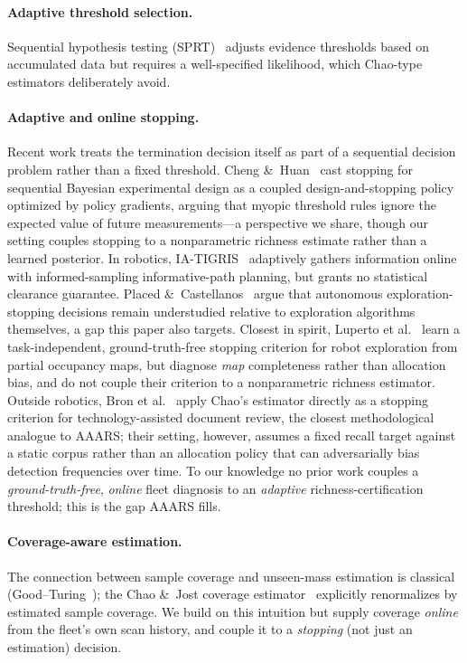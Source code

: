 \documentclass[11pt]{article}
\begin{document}
\paragraph{Adaptive threshold selection.}
Sequential hypothesis testing (SPRT)~\cite{wald1945} adjusts evidence thresholds based on
accumulated data but requires a well-specified likelihood, which Chao-type estimators deliberately
avoid.

\paragraph{Adaptive and online stopping.}
Recent work treats the termination decision itself as part of a sequential decision problem rather
than a fixed threshold. Cheng \&~Huan~\cite{cheng2025optimal} cast stopping for sequential Bayesian
experimental design as a coupled design-and-stopping policy optimized by policy gradients, arguing
that myopic threshold rules ignore the expected value of future measurements---a perspective we
share, though our setting couples stopping to a nonparametric richness estimate rather than a
learned posterior. In robotics, IA-TIGRIS~\cite{moon2026iatigris} adaptively gathers information
online with informed-sampling informative-path planning, but grants no statistical clearance
guarantee. Placed \&~Castellanos~\cite{placed2022enough} argue that autonomous exploration-stopping
decisions remain understudied relative to exploration algorithms themselves, a gap this paper also
targets. Closest in spirit, Luperto et al.~\cite{luperto2025mapcompleteness} learn a task-independent,
ground-truth-free stopping criterion for robot exploration from partial occupancy maps, but diagnose
\emph{map} completeness rather than allocation bias, and do not couple their criterion to a
nonparametric richness estimator. Outside robotics, Bron et al.~\cite{bron2024chaotar} apply Chao's
estimator directly as a stopping criterion for technology-assisted document review, the closest
methodological analogue to AAARS; their setting, however, assumes a fixed recall target against a
static corpus rather than an allocation policy that can adversarially bias detection frequencies
over time. To our knowledge no prior work couples a \emph{ground-truth-free}, \emph{online} fleet
diagnosis to an \emph{adaptive} richness-certification threshold; this is the gap AAARS fills.

\paragraph{Coverage-aware estimation.}
The connection between sample coverage and unseen-mass estimation is classical
(Good--Turing~\cite{good1953}); the Chao \&~Jost coverage estimator~\cite{chao2012} explicitly
renormalizes by estimated sample coverage. We build on this intuition but supply coverage
\emph{online} from the fleet's own scan history, and couple it to a \emph{stopping} (not just an
estimation) decision.
\end{document}
